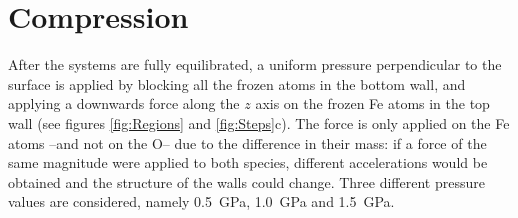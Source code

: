 \documentclass[aps,prb,reprint,superscriptaddress, a4paper]{revtex4-1}
\begin{document}
\section{Compression}

After the systems are fully equilibrated, a uniform pressure perpendicular to the surface is applied by blocking all the frozen atoms in the bottom wall, and applying a downwards force along the $z$ axis on the frozen Fe atoms in the top wall (see figures \ref{fig:Regions} and \ref{fig:Steps}c). The force is only applied on the Fe atoms --and not on the O-- due to the difference in their mass: if a force of the same magnitude  were applied to both species, different accelerations would be obtained and the structure of the walls could change. Three different pressure  values are considered, namely \SI{0.5}{\giga\pascal}, \SI{1.0}{\giga\pascal} and \SI{1.5}{\giga\pascal}. 
\end{document}

